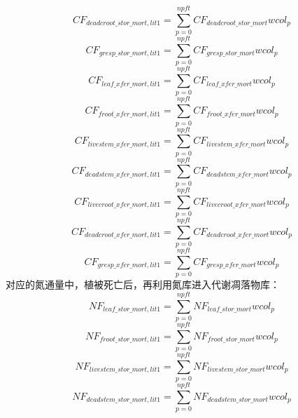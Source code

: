 \begin{equation}
  CF_{deadcroot\_{{stor}\_{mort}},lit1}=\sum_{p=0}^{npft}{CF_{deadcroot\_{{stor}\_{mort}}}{wcol_p}}
\end{equation}
\begin{equation}
  CF_{gresp\_{{stor}\_{mort}},lit1}=\sum_{p=0}^{npft}{CF_{gresp\_{{stor\_{mort}}}}{wcol_p}}
\end{equation}
\begin{equation}
  CF_{leaf\_{xfer\_{mort,lit1}}}=\sum_{p=0}^{npft}{CF_{leaf\_{{xfer\_{mort}}}}{wcol_p}}
\end{equation}
\begin{equation}
  CF_{froot\_{xfer\_{mort,lit1}}}=\sum_{p=0}^{npft}{CF_{froot\_{{xfer\_{mort}}}}{wcol_p}}
\end{equation}
\begin{equation}
  CF_{livestem\_{xfer\_{mort,lit1}}}=\sum_{p=0}^{npft}{CF_{livestem\_{{xfer\_{mort}}}}{wcol_p}}
\end{equation}
\begin{equation}
  CF_{deadstem\_{xfer\_{mort,lit1}}}=\sum_{p=0}^{npft}{CF_{deadstem\_{xfer\_{mort}}}{wcol_p}}
\end{equation}
\begin{equation}
  CF_{livecroot\_{xfer\_{mort,lit1}}}=\sum_{p=0}^{npft}{CF_{livecroot\_{{xfer\_{mort}}}}{wcol_p}}
\end{equation}
\begin{equation}
  CF_{deadcroot\_{xfer\_{mort,lit1}}}=\sum_{p=0}^{npft}{CF_{deadcroot\_{{xfer\_{mort}}}}{wcol_p}}
\end{equation}
\begin{equation}
  CF_{gresp\_{xfer\_{mort,lit1}}}=\sum_{p=0}^{npft}{CF_{gresp\_{{xfer}\_{mort}}}{wcol_p}}
\end{equation}
对应的氮通量中，植被死亡后，再利用氮库进入代谢凋落物库：
\begin{equation}
  NF_{leaf\_{{stor}\_{mort}},lit1}=\sum_{p=0}^{npft}{NF_{leaf\_{{stor}\_{mort}}}{wcol_p}}
\end{equation}
\begin{equation}
  NF_{froot\_{{stor}\_{mort}},lit1}=\sum_{p=0}^{npft}{NF_{froot\_{{stor}\_{mort}}}{wcol_p}}
\end{equation}
\begin{equation}
  NF_{livestem\_{{stor}\_{mort}},lit1}=\sum_{p=0}^{npft}{NF_{livestem\_{{stor}\_{mort}}}{wcol_p}}
\end{equation}
\begin{equation}
  NF_{deadstem\_{{stor}\_{mort}},lit1}=\sum_{p=0}^{npft}{NF_{deadstem\_{{stor}\_{mort}}}{wcol_p}}
\end{equation}
